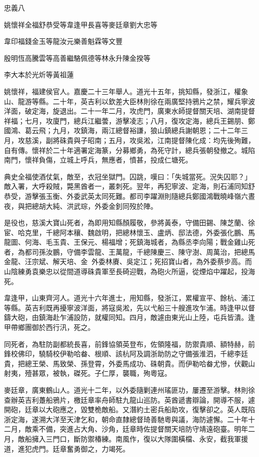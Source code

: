 
\begin{pinyinscope}
忠義八

姚懷祥全福舒恭受等韋逢甲長喜等麥廷章劉大忠等

韋印福錢金玉等龍汝元樂善魁霖等文豐

殷明恆高騰雲等高善繼駱佩德等林永升陳金揆等

李大本於光炘等黃祖蓮

姚懷祥，福建侯官人。嘉慶二十三年舉人。道光十五年，挑知縣，發浙江，權象山、龍游等縣。二十年，英吉利以欽差大臣林則徐在兩廣堅持鴉片之禁，耀兵寧波洋面，破定海，旋退出。二十一年二月，攻虎門，廣東水師提督關天培、湖南提督祥福；七月，攻廈門，總兵江繼蕓，游擊凌志；八月，復攻定海，總兵王錫朋、鄭國鴻、葛云飛；九月，攻鎮海，兩江總督裕謙，狼山鎮總兵謝朝恩；二十二年三月，攻慈溪，副將硃貴與子昭南；五月，攻吳淞，江南提督陳化成：均先後殉難，自有傳。懷祥於二十年適署定海篆，分募鄉勇，為死守計，總兵張朝發撤之。城陷南門，懷祥負傷，立城上呼兵，無應者，憤甚，投成仁塘死。

典史全福使酒仗氣，敵至，衣冠坐獄門。囚跳，嘆曰：「失城當死。況失囚耶？」敵入署，大呼殺賊，斃黑酋者一，叢刺死。翌年，再犯寧波、定海，則石浦同知舒恭受，游擊張玉衡、外委武英太同死難。都司李躍淵則隨總兵鄭國鴻戰曉峰嶺六晝夜，與把總胡大純、洪武琮，外委金釗同歿於陣。

是役也，慈溪大寶山死者，為即用知縣顏履敬，參將黃泰，守備田錫、陳芝蘭、徐宦、哈克里，千總阿本穰、魏啟明，把總林懷玉、盧炳、邸法德，外委張化鵬、馬龍圖、何海、毛玉貴、王保元、楊福增；死鎮海城者，為縣丞李向陽；戰金雞山死者，為都司孫汝鵬，守備李雲龍、王萬龍，千總陳慶三、陳守澍、周萬治，把總馬金龍、汪宗斌、解天培、金，外委林賡、吳定江；死招寶山者，為外委蔡步高。而山陰練勇袁樂忠以從間道導硃貴軍至長碕迎戰，為砲火所逼，從煙焰中躍起，投海死。

韋逢甲，山東齊河人。道光十六年進士，用知縣，發浙江，累權宣平、餘杭、浦江等縣。英吉利既再擾寧波洋面，將寇吳淞，先以弋船三十艘進攻乍浦。時逢甲以督鑄大砲，由鎮海赴乍浦設防，就權同知。四月，敵遽由東光山上陸，屯兵皆潰。逢甲帶鄉團御於西行汛，死之。

同死者，為駐防副都統長喜，前鋒協領英登布，佐領隆福，防禦貴順、額特赫，前鋒校佛印，驍騎校伊勒哈畚、根順、該杭阿及調浙助防之守備張淮泗，千總李廷貴，把總王榮、馬致榮、孫登霄，外委馬成功、硃朝貴。而伊勒哈畚尤慘，伏觀山射夷，殪甚眾，被執，磔死。子仁厚，襲職，殉粵寇。

麥廷章，廣東鶴山人。道光十二年，以外委隨剿連州瑤匪功，屢遷至游擊。林則徐查辦英吉利躉船鴉片，檄廷章率舟師駐九龍山巡防。英酋遞書辯論，開導不服，遽開砲，廷章以大砲應之，毀雙桅敵船。又潛約土密兵船助攻，復擊卻之。英人既陷浙定海，遂溯大洋至天津乞和，朝命直隸總督琦善馳粵與議，海防遽懈。二十年十二月，敵乘不備，突進占大角、沙角，廷章時佐提督關天培防守靖遠砲臺。明年二月，敵船擁入三門口，斷防禦椿練。南風作，復以大隊圍橫檔、永安，截我軍援道，進犯虎門。廷章奮勇御之，力竭死。


\end{pinyinscope}
